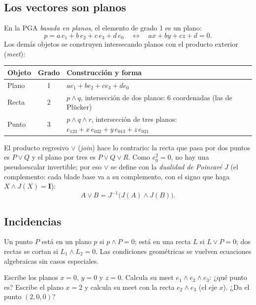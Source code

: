 \documentclass[11pt,a4paper]{article}
\numberwithin{equation}{section}
\newcommand{\I}{\mathbf{I}}
\begin{document}
\subsection{Los vectores son planos}
En la PGA \emph{basada en planos}, el elemento de grado 1 es un plano:
\begin{equation}
  p = a\,e_1 + b\,e_2 + c\,e_3 + d\,e_0 \quad\longleftrightarrow\quad ax + by + cz + d = 0 .
\end{equation}
Los demás objetos se construyen intersecando planos con el producto exterior (\emph{meet}):

\begin{tabularx}{\linewidth}{@{}l c Y@{}}
\toprule
\textbf{Objeto} & \textbf{Grado} & \textbf{Construcción y forma}\\
\midrule
Plano & 1 & $a e_1 + b e_2 + c e_3 + d e_0$\\
Recta & 2 & $p\wedge q$, intersección de dos planos: 6 coordenadas (las de Plücker)\\
Punto & 3 & $p\wedge q\wedge r$, intersección de tres planos: $e_{123} + x\,e_{032} + y\,e_{013} + z\,e_{021}$\\
\bottomrule
\end{tabularx}

\medskip
El producto regresivo $\vee$ (\emph{join}) hace lo contrario: la recta que pasa por dos puntos es $P\vee Q$ y el plano
por tres es $P\vee Q\vee R$. Como $e_0^2 = 0$, no hay una pseudoescalar invertible; por eso $\vee$ se define con la
\emph{dualidad de Poincaré} $J$ (el complemento: cada blade base va a su complemento, con el signo que haga
$X\wedge J(X) = \I$):
\begin{equation}
  A\vee B = J^{-1}\bigl(J(A)\wedge J(B)\bigr).
\end{equation}

\subsection{Incidencias}
Un punto $P$ está en un plano $p$ si $p\wedge P = 0$; está en una recta $L$ si $L\vee P = 0$; dos rectas se cortan si
$L_1\wedge L_2 = 0$. Las condiciones geométricas se vuelven ecuaciones algebraicas sin casos especiales.

\begin{ejercicio}{0.3}
Escribe los planos $x = 0$, $y = 0$ y $z = 0$. Calcula su meet $e_1\wedge e_2\wedge e_3$: ¿qué punto es? Escribe el
plano $x = 2$ y calcula su meet con la recta $e_2\wedge e_3$ (el eje $x$). ¿Da el punto $(2,0,0)$?
\end{ejercicio}
\end{document}

